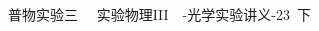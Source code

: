 \documentclass{whureport}
\begin{document}
\begin{multicols}{2}
\begin{thebibliography}{99}
		 普物实验三 \ \  实验物理III\ \  -光学实验讲义-23\  下
	\end{thebibliography}
		
\end{multicols}
\end{document}
